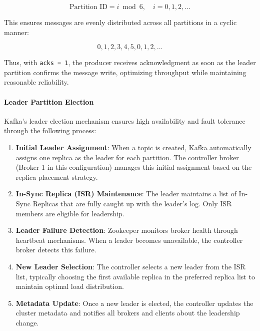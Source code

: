 \begin{equation}
    \text{Partition ID} = i \bmod 6, \quad i = 0, 1, 2, \ldots
\end{equation}

This ensures messages are evenly distributed across all partitions in a cyclic manner:

\[
0, 1, 2, 3, 4, 5, 0, 1, 2, \ldots
\]

Thus, with \texttt{acks = 1}, the producer receives acknowledgment as soon as the leader partition confirms the message write, optimizing throughput while maintaining reasonable reliability.

\paragraph{Leader Partition Election}

Kafka's leader election mechanism ensures high availability and fault tolerance through the following process:

\begin{enumerate}
    \item \textbf{Initial Leader Assignment}: When a topic is created, Kafka automatically assigns one replica as the leader for each partition. The controller broker (Broker 1 in this configuration) manages this initial assignment based on the replica placement strategy.
    
    \item \textbf{In-Sync Replica (ISR) Maintenance}: The leader maintains a list of In-Sync Replicas that are fully caught up with the leader's log. Only ISR members are eligible for leadership.
    
    \item \textbf{Leader Failure Detection}: Zookeeper monitors broker health through heartbeat mechanisms. When a leader becomes unavailable, the controller broker detects this failure.
    
    \item \textbf{New Leader Selection}: The controller selects a new leader from the ISR list, typically choosing the first available replica in the preferred replica list to maintain optimal load distribution.
    
    \item \textbf{Metadata Update}: Once a new leader is elected, the controller updates the cluster metadata and notifies all brokers and clients about the leadership change.
\end{enumerate}

